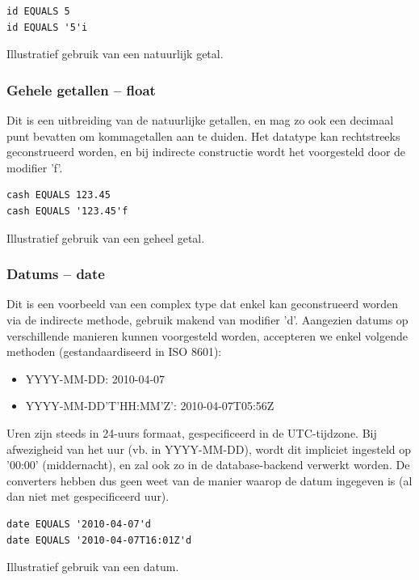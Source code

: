 \begin{code}
\begin{verbatim}
id EQUALS 5
id EQUALS '5'i
\end{verbatim}
\caption{Illustratief gebruik van een natuurlijk getal.}
\end{code}

\subsubsection{Gehele getallen -- float}

Dit is een uitbreiding van de natuurlijke getallen, en mag zo ook een decimaal punt bevatten om kommagetallen aan te duiden. Het datatype kan rechtstreeks geconstrueerd worden, en bij indirecte constructie wordt het voorgesteld door de modifier 'f'.

\begin{code}
\begin{verbatim}
cash EQUALS 123.45
cash EQUALS '123.45'f
\end{verbatim}
\caption{Illustratief gebruik van een geheel getal.}
\end{code}

\subsubsection{Datums -- date}

Dit is een voorbeeld van een complex type dat enkel kan geconstrueerd worden via de indirecte methode, gebruik makend van modifier 'd'. Aangezien datums op verschillende manieren kunnen voorgesteld worden, accepteren we enkel volgende methoden (gestandaardiseerd in ISO 8601):
\begin{itemize}
\item{YYYY-MM-DD: 2010-04-07}
\item{YYYY-MM-DD'T'HH:MM'Z': 2010-04-07T05:56Z}
\end{itemize}

Uren zijn steeds in 24-uurs formaat, gespecificeerd in de UTC-tijdzone. Bij afwezigheid van het uur (vb. in YYYY-MM-DD), wordt dit impliciet ingesteld op '00:00' (middernacht), en zal ook zo in de database-backend verwerkt worden. De converters hebben dus geen weet van de manier waarop de datum ingegeven is (al dan niet met gespecificeerd uur).

\begin{code}
\begin{verbatim}
date EQUALS '2010-04-07'd
date EQUALS '2010-04-07T16:01Z'd
\end{verbatim}
\caption{Illustratief gebruik van een datum.}
\end{code}


